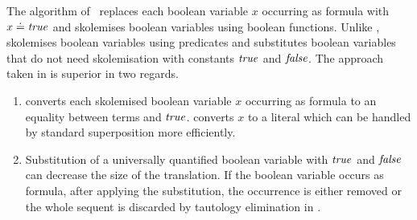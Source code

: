 The \oldcnf{} algorithm of~\cite{FOOL} 
replaces each boolean variable $x$ occurring as formula with $x \doteq \mathit{true}$ and skolemises boolean variables using boolean \skolem{} functions. 
Unlike \oldcnf{}, \nfcnf{} skolemises boolean variables using \skolem{} predicates and substitutes boolean variables that do not need skolemisation with constants $\mathit{true}$ and $\mathit{false}$. 
The approach taken in \nfcnf{} is superior in two regards.
\begin{enumerate}
  \item \oldcnf{} converts each skolemised boolean variable $x$ occurring as formula to an equality between \skolem{} terms and $\mathit{true}$. \nfcnf{} converts $x$ to a \skolem{} literal which can be handled by standard superposition more efficiently. 
  \item Substitution of a universally quantified boolean variable with $\mathit{true}$ and $\mathit{false}$ can decrease the size of the translation. If the boolean variable occurs as formula, after applying the substitution,  the occurrence is either removed or the whole sequent is discarded by tautology elimination in \nfcnf{}.
\end{enumerate}



